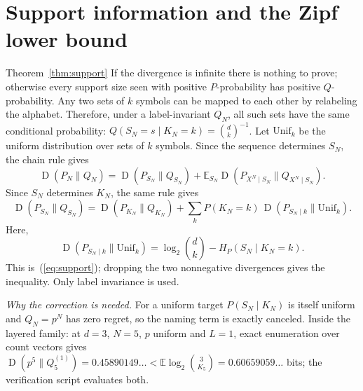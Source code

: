 \documentclass[anon]{alt2027}
\newcommand{\E}{\mathbb{E}}
\newcommand{\KL}{\operatorname{D}}
\renewcommand{\eqref}[1]{(\ref{#1})}
\begin{document}
\section{Support information and the Zipf lower bound}
\label{app:support}

\begin{proofof}{Theorem~\ref{thm:support}}
If the divergence is infinite there is nothing to prove; otherwise every support size seen with positive $P$-probability has positive $Q$-probability. Any two sets of $k$ symbols can be mapped to each other by relabeling the alphabet. Therefore, under a label-invariant $Q_N$, all such sets have the same conditional probability: $Q(S_N=s\mid K_N=k)=\binom dk^{-1}$. Let $\mathrm{Unif}_k$ be the uniform distribution over sets of $k$ symbols. Since the sequence determines $S_N$, the chain rule gives \[\KL(P_N\|Q_N)=\KL(P_{S_N}\|Q_{S_N})+\E_{S_N}\KL(P_{X^N\mid S_N}\|Q_{X^N\mid S_N}).\] Since $S_N$ determines $K_N$, the same rule gives \[\KL(P_{S_N}\|Q_{S_N})=\KL(P_{K_N}\|Q_{K_N})+\sum_kP(K_N=k)\,\KL(P_{S_N\mid k}\|\mathrm{Unif}_k).\] Here, \[\KL(P_{S_N\mid k}\|\mathrm{Unif}_k)=\log_2\binom dk-H_P(S_N\mid K_N=k).\] This is~\eqref{eq:support}; dropping the two nonnegative divergences gives the inequality. Only label invariance is used.
\end{proofof}
\emph{Why the correction is needed.} For a uniform target $P(S_N\mid K_N)$ is itself uniform and $Q_N=p^N$ has zero regret, so the naming term is exactly canceled. Inside the layered family: at $d=3$, $N=5$, $p$ uniform and $L=1$, exact enumeration over count vectors gives $\KL(p^5\|Q^{(1)}_5)=0.45890149\ldots<\E\log_2\binom{3}{K_5}=0.60659059\ldots$ bits; the verification script evaluates both.
\end{document}
